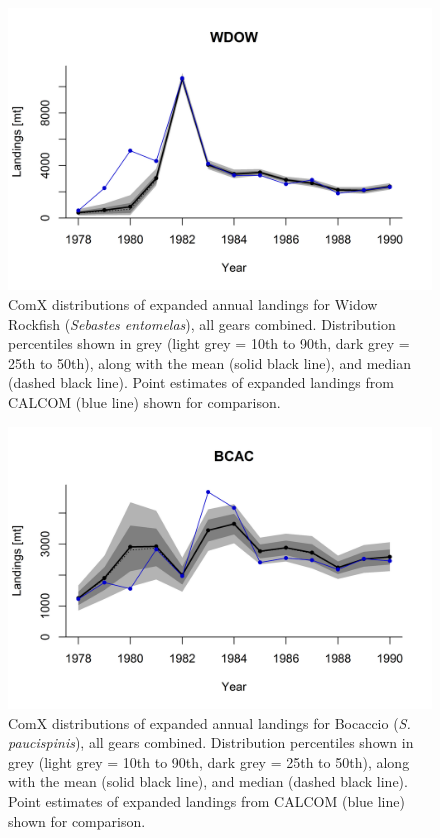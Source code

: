 \documentclass[12pt]{article}
\begin{document}
%
\clearpage
%

\begin{landscape}
\begin{figure}
\centering
\vspace{-2cm}
\includegraphics[width=1.3\textwidth]{./pictures/sp-yr/WDOW.png}
\caption{ComX distributions of expanded annual landings for Widow Rockfish 
(\textit{Sebastes entomelas}), all gears combined. Distribution percentiles shown in grey 
(light grey = 10th to 90th, dark grey = 25th to 50th), along with the mean 
(solid black line), and median (dashed black line). Point estimates of 
expanded landings from CALCOM (blue line) shown for comparison.}
\label{Y1}
\end{figure}
\end{landscape}

%
\clearpage
%

\begin{landscape}
\begin{figure}
\centering
\vspace{-2cm}
\includegraphics[width=1.3\textwidth]{./pictures/sp-yr/BCAC.png}
\caption{ComX distributions of expanded annual landings for Bocaccio 
(\textit{S. paucispinis}), all gears combined. Distribution percentiles shown in grey 
(light grey = 10th to 90th, dark grey = 25th to 50th), along with the mean 
(solid black line), and median (dashed black line). Point estimates of 
expanded landings from CALCOM (blue line) shown for comparison.}
\label{Y2}
\end{figure}
\end{landscape}
\end{document}
